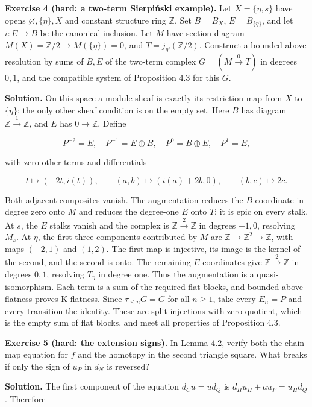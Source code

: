 \documentclass[
  english,
  11pt,
  a4paper,
]{article}
\begin{document}
\textbf{Exercise 4 (hard: a two-term Sierpiński example).} Let
\(X=\{\eta,s\}\) have opens \(\varnothing,\{\eta\},X\) and constant
structure ring \(\mathbb Z\). Set \(B=B_X\), \(E=B_{\{\eta\}}\), and let
\(i:E\to B\) be the canonical inclusion. Let \(M\) have section diagram
\(M(X)=\mathbb Z/2\to M(\{\eta\})=0\), and \(T=j_{\eta!}(\mathbb Z/2)\).
Construct a bounded-above resolution by sums of \(B,E\) of the two-term
complex \(G=(M\xrightarrow{0}T)\) in degrees \(0,1\), and the compatible
system of Proposition 4.3 for this \(G\).

\textbf{Solution.} On this space a module sheaf is exactly its
restriction map from \(X\) to \(\{\eta\}\); the only other sheaf
condition is on the empty set. Here \(B\) has diagram
\(\mathbb Z\xrightarrow{1}\mathbb Z\), and \(E\) has \(0\to\mathbb Z\).
Define

\[P^{-2}=E,\quad P^{-1}=E\oplus B,\quad
P^0=B\oplus E,\quad P^1=E,\]

with zero other terms and differentials

\[t\longmapsto(-2t,i(t)),\qquad
(a,b)\longmapsto(i(a)+2b,0),\qquad
(b,c)\longmapsto2c.\]

Both adjacent composites vanish. The augmentation reduces the \(B\)
coordinate in degree zero onto \(M\) and reduces the degree-one \(E\)
onto \(T\); it is epic on every stalk. At \(s\), the \(E\) stalks vanish
and the complex is \(\mathbb Z\xrightarrow{2}\mathbb Z\) in degrees
\(-1,0\), resolving \(M_s\). At \(\eta\), the first three components
contributed by \(M\) are \(\mathbb Z\to\mathbb Z^2\to\mathbb Z\), with
maps \((-2,1)\) and \((1,2)\). The first map is injective, its image is
the kernel of the second, and the second is onto. The remaining \(E\)
coordinates give \(\mathbb Z\xrightarrow{2}\mathbb Z\) in degrees
\(0,1\), resolving \(T_\eta\) in degree one. Thus the augmentation is a
quasi-isomorphism. Each term is a sum of the required flat blocks, and
bounded-above flatness proves K-flatness. Since \(\tau_{\le n}G=G\) for
all \(n\ge1\), take every \(E_n=P\) and every transition the identity.
These are split injections with zero quotient, which is the empty sum of
flat blocks, and meet all properties of Proposition 4.3.

\textbf{Exercise 5 (hard: the extension signs).} In Lemma 4.2, verify
both the chain-map equation for \(f\) and the homotopy in the second
triangle square. What breaks if only the sign of \(u_P\) in \(d_N\) is
reversed?

\textbf{Solution.} The first component of the equation \(d_Cu=u d_Q\) is
\(d_Hu_H+a u_P=u_Hd_Q\). Therefore
\end{document}

